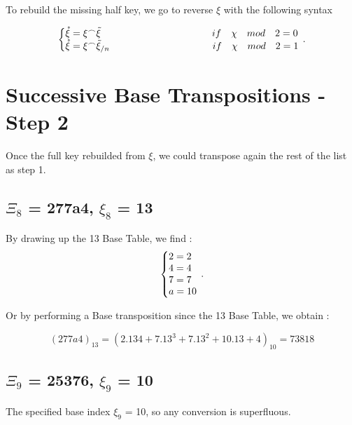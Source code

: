 \documentclass{article}
\begin{document}
\begin{flushleft}
To rebuild the missing half key, we go to reverse $\xi$ with the following syntax 	
\end{flushleft}

\begin{equation}
\centering
\left\{\begin{array}{@{}l@{}}
\mathring{\xi} = \xi^\frown  \tilde{\xi} \hspace*{4cm} if \quad \chi \quad mod \quad 2 = 0\\
\mathring{\xi} = \xi^\frown  \tilde{\xi}_{/n} \hspace*{3.7cm} if \quad \chi \quad mod \quad 2 = 1
\end{array}\right.\,.
\end{equation}

\section*{Successive Base Transpositions - Step 2}

Once the full key rebuilded from $\xi$, we could transpose again the rest of the list as step 1.

\subsection{$\Xi_{8}$ = 277a4, $\xi_{8}$ = 13}
By drawing up the 13 Base Table, we find :
\begin{equation}
\centering
\left\{\begin{array}{@{}l@{}}
2=2 \\
4=4 \\
7=7 \\
a=10 \\
\end{array}\right.\,.
\end{equation}

\begin{flushleft}
	Or by performing a Base transposition since the 13 Base Table, we obtain :
\end{flushleft}
\begin{equation}
(277a4)_{13}=(2.13{4}+7.13^{3}+7.13^{2}+10.13+4)_{10}=73818
\end{equation}

\subsection{$\Xi_{9}$ = 25376, $\xi_{9}$ = 10}
The specified base index $\xi_{9}$ = 10, so any conversion is superfluous.
\end{document}
